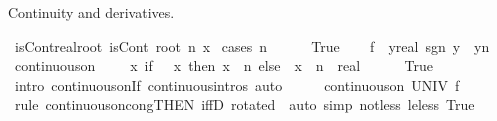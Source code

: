 \begin{isabellebody}
\begin{isamarkuptext}
Continuity and derivatives.%
\end{isamarkuptext}\isamarkuptrue%
\isamarkupfalse%
\ isCont{\isacharunderscore}{\kern0pt}real{\isacharunderscore}{\kern0pt}root{\isacharcolon}{\kern0pt}\ {\isachardoublequoteopen}isCont\ {\isacharparenleft}{\kern0pt}root\ n{\isacharparenright}{\kern0pt}\ x{\isachardoublequoteclose}\isanewline
%
\isadelimproof
%
\endisadelimproof
%
\isatagproof
{}\isamarkupfalse%
\ {\isacharparenleft}{\kern0pt}cases\ {\isachardoublequoteopen}n\ {\isachargreater}{\kern0pt}\ {}{\isachardoublequoteclose}{\isacharparenright}{\kern0pt}\isanewline
\ \ \isamarkupfalse%
\ True\isanewline
\ \ \isamarkupfalse%
\ {\isacharquery}{\kern0pt}f\ {\isacharequal}{\kern0pt}\ {\isachardoublequoteopen}{\isasymlambda}y{\isacharcolon}{\kern0pt}{\isacharcolon}{\kern0pt}real{\isachardot}{\kern0pt}\ sgn\ y\ {\isacharasterisk}{\kern0pt}\ {\isasymbar}y{\isasymbar}{\isacharcircum}{\kern0pt}n{\isachardoublequoteclose}\isanewline
\ \ \isamarkupfalse%
\ {\isachardoublequoteopen}continuous{\isacharunderscore}{\kern0pt}on\ {\isacharparenleft}{\kern0pt}{\isacharbraceleft}{\kern0pt}{}{\isachardot}{\kern0pt}{\isachardot}{\kern0pt}{\isacharbraceright}{\kern0pt}\ {\isasymunion}\ {\isacharbraceleft}{\kern0pt}{\isachardot}{\kern0pt}{\isachardot}{\kern0pt}\ {}{\isacharbraceright}{\kern0pt}{\isacharparenright}{\kern0pt}\ {\isacharparenleft}{\kern0pt}{\isasymlambda}x{\isachardot}{\kern0pt}\ if\ {}\ {\isacharless}{\kern0pt}\ x\ then\ x\ {\isacharcircum}{\kern0pt}\ n\ else\ {\isacharminus}{\kern0pt}\ {\isacharparenleft}{\kern0pt}{\isacharparenleft}{\kern0pt}{\isacharminus}{\kern0pt}x{\isacharparenright}{\kern0pt}\ {\isacharcircum}{\kern0pt}\ n{\isacharparenright}{\kern0pt}\ {\isacharcolon}{\kern0pt}{\isacharcolon}{\kern0pt}\ real{\isacharparenright}{\kern0pt}{\isachardoublequoteclose}\isanewline
\ \ \ \ \isamarkupfalse%
\ True\ \isamarkupfalse%
\ {\isacharparenleft}{\kern0pt}intro\ continuous{\isacharunderscore}{\kern0pt}on{\isacharunderscore}{\kern0pt}If\ continuous{\isacharunderscore}{\kern0pt}intros{\isacharparenright}{\kern0pt}\ auto\isanewline
\ \ \isamarkupfalse%
\ \isamarkupfalse%
\ {\isachardoublequoteopen}continuous{\isacharunderscore}{\kern0pt}on\ UNIV\ {\isacharquery}{\kern0pt}f{\isachardoublequoteclose}\isanewline
\ \ \ \ \isamarkupfalse%
\ {\isacharparenleft}{\kern0pt}rule\ continuous{\isacharunderscore}{\kern0pt}on{\isacharunderscore}{\kern0pt}cong{\isacharbrackleft}{\kern0pt}THEN\ iffD{}{\isacharcomma}{\kern0pt}\ rotated\ {}{\isacharbrackright}{\kern0pt}{\isacharparenright}{\kern0pt}\ {\isacharparenleft}{\kern0pt}auto\ simp{\isacharcolon}{\kern0pt}\ not{\isacharunderscore}{\kern0pt}less\ le{\isacharunderscore}{\kern0pt}less\ True{\isacharparenright}{\kern0pt}\isanewline

\end{isabellebody}
